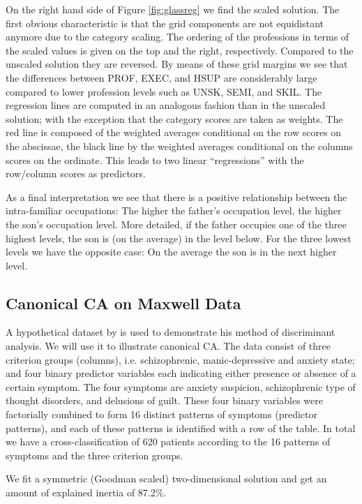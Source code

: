 \documentclass[article]{Z}
\begin{document}
On the right hand side of Figure \ref{fig:glassreg} we find the scaled solution. The first obvious characteristic is that the grid components are not equidistant anymore due to the category scaling. The ordering of the professions in terms of the scaled values is given on the top and the right, respectively. Compared to the unscaled solution they are reversed. By means of these grid margins we see that the differences between PROF, EXEC, and HSUP are considerably large compared to lower profession levels such as UNSK, SEMI, and SKIL. The regression lines are computed in an analogous fashion than in the unscaled solution; with the exception that the category scores are taken as weights. The red line is composed of the weighted averages conditional on the row scores on the abscissae, the black line by the weighted averages conditional on the columns scores on the ordinate. This leads to two linear ``regressions'' with the row/column scores as predictors. 

As a final interpretation we see that there is a positive relationship between the intra-familiar occupations: The higher the father's occupation level, the higher the son's occupation level. More detailed, if the father occupies one of the three highest levels, the son is (on the average) in the level below. For the three lowest levels we have the opposite case: On the average the son is in the next higher level.  

\subsection{Canonical CA on Maxwell Data}
A hypothetical dataset by \citet{Maxwell:61} is used to demonstrate his method of discriminant analysis.
We will use it to illustrate canonical CA. The data consist of three criterion groups (columns), i.e. schizophrenic, manic-depressive and anxiety state; and four binary predictor variables each indicating either presence or absence of a certain symptom. The four symptoms are anxiety suspicion, schizophrenic type of thought disorders, and delusions of guilt. These four binary variables were factorially combined to form 16 distinct patterns of symptoms (predictor patterns), and each of these patterns is identified with a row of the table. In total we have a cross-classification of 620 patients according to the 16 patterns of symptoms and the three criterion groups. 

We fit a symmetric (Goodman scaled) two-dimensional solution and get an amount of explained inertia of 87.2\%. 
\end{document}
